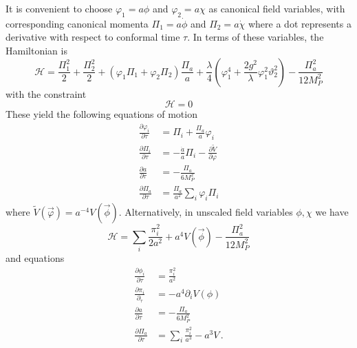 It is convenient to choose $\varphi_1 = a\phi$ and $\varphi_2 = a\chi$ as canonical field variables, with corresponding canonical momenta $\Pi_1 = a\dot{\phi}$ and $\Pi_2=a\dot{\chi}$ where a dot represents a derivative with respect to conformal time $\tau$.
In terms of these variables, the Hamiltonian is
\begin{equation}
  \mathcal{H} = \frac{\Pi_1^2}{2} + \frac{\Pi_2^2}{2} + \left(\varphi_1\Pi_1 + \varphi_2\Pi_2\right)\frac{\Pi_a}{a} + \frac{\lambda}{4}\left(\varphi_1^4 + \frac{2g^2}{\lambda}\varphi_1^2\vartheta_2^2 \right) - \frac{\Pi_a^2}{12 M_P^2}
\end{equation}
with the constraint
\begin{equation}
  \mathcal{H} = 0
\end{equation}
These yield the following equations of motion
\begin{align}\label{eqn:eom_scale}
  \frac{\partial\varphi_i}{\partial\tau} &= \Pi_i + \frac{\Pi_a}{a}\varphi_i \\
  \frac{\partial\Pi_i}{\partial\tau}     &= -\frac{\dot{a}}{a}\Pi_i - \frac{\partial \tilde{V}}{\partial\varphi} \\
  \frac{\partial a}{\partial\tau}        &= -\frac{\Pi_a}{6M_P^2} \\
  \frac{\partial\Pi_a}{\partial\tau}     &= \frac{\Pi_a}{a^2}\sum_i\varphi_i\Pi_i
\end{align}
where $\tilde{V}(\vec{\varphi}) = a^{-4}V(\vec{\phi})$.
Alternatively, in unscaled field variables $\phi,\chi$ we have
\begin{equation}
  \mathcal{H} = \sum_i\frac{\pi_i^2}{2a^2} + a^4V(\vec{\phi}) - \frac{\Pi_a^2}{12M_P^2}
\end{equation}
and equations
\begin{align}\label{eqn:eom_noscale}
  \frac{\partial\phi_i}{\partial\tau} &= \frac{\pi_i^2}{a^2} \\
  \frac{\partial\pi_i}{\partial_\tau} &= -a^4 \partial_iV(\phi) \\
  \frac{\partial a}{\partial\tau}     &= -\frac{\Pi_a}{6M_P^2} \\
  \frac{\partial\Pi_a}{\partial\tau}  &= \sum_i\frac{\pi_i^2}{a^3} - a^3V \, .
\end{align}

